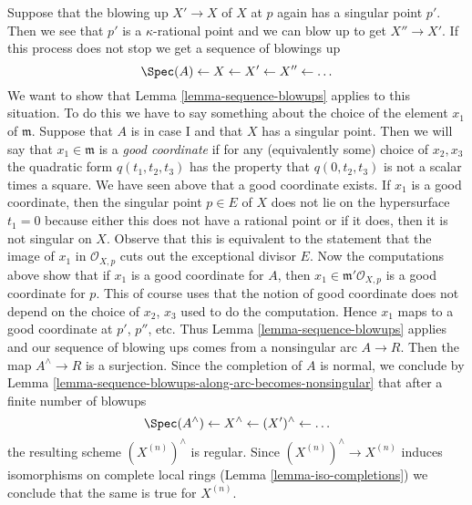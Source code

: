 \medskip\noindent
Suppose that the blowing up $X' \to X$ of $X$ at $p$ again has a
singular point $p'$. Then we see that $p'$ is a $\kappa$-rational
point and we can blow up to get $X'' \to X'$. If this process
does not stop we get a sequence of blowings up
$$
\Spec(A) \leftarrow X \leftarrow X' \leftarrow X'' \leftarrow \ldots
$$
We want to show that
Lemma \ref{lemma-sequence-blowups}
applies to this situation. To do this we have to say something
about the choice of the element $x_1$ of $\mathfrak m$.
Suppose that $A$ is in case I and that $X$ has a singular point.
Then we will say that $x_1 \in \mathfrak m$ is a {\it good coordinate}
if for any (equivalently some) choice of $x_2, x_3$ the quadratic
form $q(t_1, t_2, t_3)$ has the property that $q(0, t_2, t_3)$
is not a scalar times a square. We have seen above that a good
coordinate exists. If $x_1$ is a good coordinate, then the
singular point $p \in E$ of $X$ does not lie on the hypersurface
$t_1 = 0$ because either this does not have a rational point or
if it does, then it is not singular on $X$. Observe that this
is equivalent to the
statement that the image of $x_1$ in $\mathcal{O}_{X, p}$ cuts
out the exceptional divisor $E$. Now the computations above show
that if $x_1$ is a good coordinate for $A$, then
$x_1 \in \mathfrak m'\mathcal{O}_{X, p}$ is a good coordinate
for $p$. This of course uses that the notion of good coordinate
does not depend on the choice of $x_2$, $x_3$ used to do the
computation. Hence $x_1$ maps to a good coordinate at
$p'$, $p''$, etc. Thus
Lemma \ref{lemma-sequence-blowups}
applies and our sequence of blowing
ups comes from a nonsingular arc $A \to R$.
Then the map $A^\wedge \to R$ is a surjection.
Since the completion of $A$ is normal, we conclude by
Lemma \ref{lemma-sequence-blowups-along-arc-becomes-nonsingular}
that after a finite number of blowups
$$
\Spec(A^\wedge) \leftarrow X^\wedge \leftarrow (X')^\wedge \leftarrow \ldots
$$
the resulting scheme $(X^{(n)})^\wedge$ is regular. Since
$(X^{(n)})^\wedge \to X^{(n)}$ induces isomorphisms on complete
local rings (Lemma \ref{lemma-iso-completions}) we conclude
that the same is true for $X^{(n)}$.


